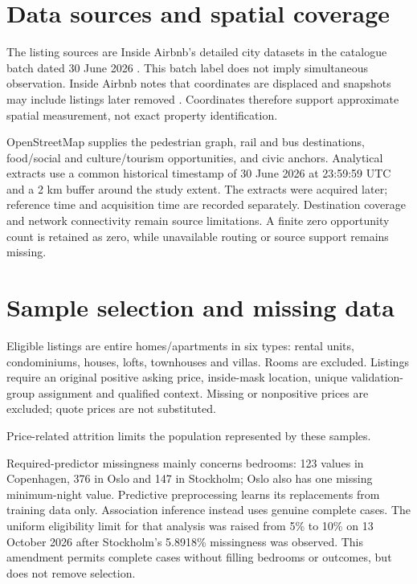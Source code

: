 \documentclass[11pt,a4paper,oneside,openany]{memoir}
\begin{document}
\section{Data sources and spatial coverage}
\label{sec:sources}
The listing sources are Inside Airbnb's detailed city datasets in the catalogue
batch dated 30 June 2026
\parencite{data_inside_cph2026,data_inside_oslo2026,data_inside_stockholm2026}.
This batch label does not imply simultaneous observation. Inside Airbnb notes
that coordinates are displaced and snapshots may include listings later removed
\parencite{data_inside_assumptions}. Coordinates therefore support approximate
spatial measurement, not exact property identification.



OpenStreetMap supplies the pedestrian graph, rail and bus destinations,
food/social and culture/tourism opportunities, and civic anchors. Analytical
extracts use a common historical timestamp of 30 June 2026 at 23:59:59 UTC and
a 2 km buffer around the study extent. The extracts were acquired later;
reference time and acquisition time are recorded separately. Destination
coverage and network connectivity remain source limitations. A finite zero
opportunity count is retained as zero, while unavailable routing or source
support remains missing.

\section{Sample selection and missing data}
\label{sec:samples}
Eligible listings are entire homes/apartments in six types: rental units,
condominiums, houses, lofts, townhouses and villas. Rooms are excluded. Listings
require an original positive asking price, inside-mask location, unique
validation-group assignment and qualified context. Missing or nonpositive
prices are excluded; quote prices are not substituted.



Price-related attrition limits the population represented by these samples.



Required-predictor missingness mainly concerns bedrooms: 123 values in
Copenhagen, 376 in Oslo and 147 in Stockholm; Oslo also has one missing
minimum-night value. Predictive preprocessing learns its replacements from
training data only. Association inference instead uses genuine complete cases.
The uniform eligibility limit for that analysis was raised from 5\% to 10\%
on 13 October 2026 after Stockholm's 5.8918\% missingness was observed. This
amendment permits complete cases without filling bedrooms or outcomes, but
does not remove selection.
\end{document}
